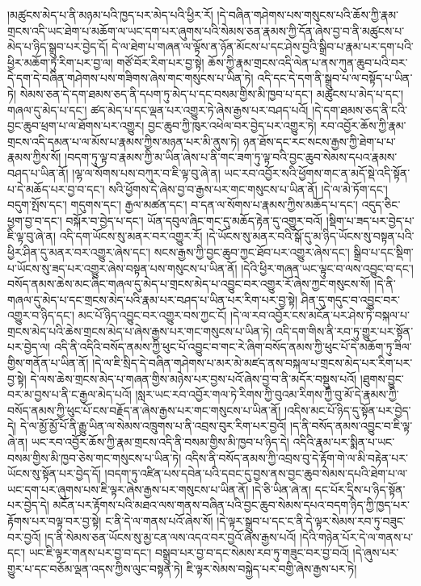 །མཚུངས་མེད་པ་ནི་མཉམ་པའི་ཁྱད་པར་མེད་པའི་ཕྱིར་རོ། །དེ་བཞིན་གཤེགས་པས་གསུངས་པའི་ཆོས་ཀྱི་རྣམ་གྲངས་འདི་ཡང་ཐེག་པ་མཆོག་ལ་ཡང་དག་པར་ཞུགས་པའི་སེམས་ཅན་རྣམས་ཀྱི་དོན་ཞེས་བྱ་བ་ནི་མཚུངས་པ་མེད་པ་ཉིད་སྒྲུབ་པར་བྱེད་དོ། དེ་ལ་ཐེག་པ་གཞན་ལ་ལྟོས་ན་ཉོན་མོངས་པ་དང་ཤེས་བྱའི་སྒྲིབ་པ་རྣམ་པར་དག་པའི་ཕྱིར་མཆོག་ཏུ་རིག་པར་བྱ་ལ། གཙོ་བོར་རིག་པར་བྱ་སྟེ། ཆོས་ཀྱི་རྣམ་གྲངས་འདི་ལེན་པ་ནས་ཀུན་ཆུབ་པའི་བར་དེ་དག་དེ་བཞིན་གཤེགས་པས་གཟིགས་ཞེས་གང་གསུངས་པ་ཡིན་ཏེ། འདི་དང་དེ་དག་ནི་སྒྲུབ་པ་ལ་བསྟོད་པ་ཡིན་ཏེ། སེམས་ཅན་དེ་དག་ཐམས་ཅད་ནི་དཔག་ཏུ་མེད་པ་དང་བསམ་གྱིས་མི་ཁྱབ་པ་དང་། མཚུངས་པ་མེད་པ་དང་། གཞལ་དུ་མེད་པ་དང་། ཚད་མེད་པ་དང་ལྡན་པར་འགྱུར་ཏེ་ཞེས་རྒྱས་པར་བཤད་པའོ། །དེ་དག་ཐམས་ཅད་ནི་ངའི་བྱང་ཆུབ་ཕྲག་པ་ལ་ཐོགས་པར་འགྱུར། བྱང་ཆུབ་ཀྱི་ཁུར་འཕེལ་བར་བྱེད་པར་འགྱུར་ཏེ། རབ་འབྱོར་ཆོས་ཀྱི་རྣམ་གྲངས་འདི་དམན་པ་ལ་མོས་པ་རྣམས་ཀྱིས་མཉན་པར་མི་ནུས་ཏེ། ཉན་ཐོས་དང་རང་སངས་རྒྱས་ཀྱི་ཐེག་པ་པ་རྣམས་ཀྱིས་སོ། །བདག་ཏུ་ལྟ་བ་རྣམས་ཀྱི་མ་ཡིན་ཞེས་པ་ནི་གང་ཟག་ཏུ་ལྟ་བའི་བྱང་ཆུབ་སེམས་དཔའ་རྣམས་བཤད་པ་ཡིན་ནོ། །ལྷ་ལ་སོགས་པས་བཀུར་བ་ཇི་ལྟ་བུ་ཞེ་ན། ཡང་རབ་འབྱོར་སའི་ཕྱོགས་གང་ན་མདོ་སྡེ་འདི་སྟོན་པ་དེ་མཆོད་པར་བྱ་བ་དང་། སའི་ཕྱོགས་དེ་ཞེས་བྱ་བ་རྒྱས་པར་གང་གསུངས་པ་ཡིན་ནོ། །དེ་ལ་མེ་ཏོག་དང་། བདུག་སྤོས་དང་། གདུགས་དང་། རྒྱལ་མཚན་དང་། བ་དན་ལ་སོགས་པ་རྣམས་ཀྱིས་མཆོད་པ་དང་། འདུད་ཅིང་ཕྱག་བྱ་བ་དང་། བསྐོར་བ་བྱེད་པ་དང་། ཡོན་དབུལ་ཞིང་གང་དུ་མཆོད་རྟེན་དུ་འགྱུར་བའོ། །སྡིག་པ་ཟད་པར་བྱེད་པ་ཇི་ལྟ་བུ་ཞེ་ན། འདི་དག་ཡོངས་སུ་མནར་བར་འགྱུར་རོ། །དེ་ཡོངས་སུ་མནར་བའི་སྒོ་དུ་མ་ཉིད་ཡོངས་སུ་བསྟན་པའི་ཕྱིར་ཤིན་དུ་མནར་བར་འགྱུར་ཞེས་དང་། སངས་རྒྱས་ཀྱི་བྱང་ཆུབ་ཀྱང་ཐོབ་པར་འགྱུར་ཞེས་དང་། སྒྲིབ་པ་དང་སྡིག་པ་ཡོངས་སུ་ཟད་པར་འགྱུར་ཞེས་བསྟན་པས་གསུངས་པ་ཡིན་ནོ། །དེའི་ཕྱིར་གཞན་ཡང་ལྟུང་བ་ལས་འབྱུང་བ་དང་། བསོད་ནམས་ཆེས་མང་ཞིང་གཞལ་དུ་མེད་པ་གྲངས་མེད་པ་འབྱུང་བར་འགྱུར་རོ་ཞེས་ཀྱང་གསུངས་སོ། །དེ་ནི་གཞལ་དུ་མེད་པ་དང་གྲངས་མེད་པའི་རྣམ་པར་བཤད་པ་ཡིན་པར་རིག་པར་བྱ་སྟེ། ཤིན་དུ་གདུང་བ་འབྱུང་བར་འགྱུར་བ་ཉིད་དང་། མང་པོ་ཉིད་འབྱུང་བར་འགྱུར་བས་ཀྱང་ངོ། །དེ་ལ་རབ་འབྱོར་ངས་མངོན་པར་ཤེས་ཏེ་བསྐལ་པ་གྲངས་མེད་པའི་ཆེས་གྲངས་མེད་པ་ཞེས་རྒྱས་པར་གང་གསུངས་པ་ཡིན་ཏེ། འདི་དག་གིས་ནི་རབ་ཏུ་གྱུར་པར་སྟོན་པར་བྱེད་ལ། འདི་ནི་འདིའི་བསོད་ནམས་ཀྱི་ཕུང་པོ་འབྱུང་བ་གང་རེ་ཞིག་བསོད་ནམས་ཀྱི་ཕུང་པོ་དེ་མཆོག་ཏུ་ཟིལ་གྱིས་གནོན་པ་ཡིན་ནོ། །དེ་ལ་ཇི་སྲིད་དེ་བཞིན་གཤེགས་པ་མར་མེ་མཛད་ནས་བསྐལ་པ་གྲངས་མེད་པར་རིག་པར་བྱ་སྟེ། དེ་ལས་ཆེས་གྲངས་མེད་པ་གཞན་གྱིས་མཉེས་པར་བྱས་པའོ་ཞེས་བྱ་བ་ནི་མདོར་བསྡུས་པའོ། །ཐུགས་བྱུང་བར་མ་བྱས་པ་ནི་ང་རྒྱལ་མེད་པའོ། །སླར་ཡང་རབ་འབྱོར་གལ་ཏེ་རིགས་ཀྱི་བུའམ་རིགས་ཀྱི་བུ་མོ་དེ་རྣམས་ཀྱི་བསོད་ནམས་ཀྱི་ཕུང་པོ་ངས་བརྗོད་ན་ཞེས་རྒྱས་པར་གང་གསུངས་པ་ཡིན་ནོ། །འདིས་མང་པོ་ཉིད་དུ་སྟོན་པར་བྱེད་དེ། དེ་ལ་མྱོ་མྱོ་པོ་ནི་རྒྱུ་ཡིན་ལ་སེམས་འཁྲུགས་པ་ནི་འབྲས་བུར་རིག་པར་བྱའོ། །ད་ནི་བསོད་ནམས་འབྱུང་བ་ཇི་ལྟ་ཞེ་ན། ཡང་རབ་འབྱོར་ཆོས་ཀྱི་རྣམ་གྲངས་འདི་ནི་བསམ་གྱིས་མི་ཁྱབ་པ་ཉིད་དེ། འདིའི་རྣམ་པར་སྨིན་པ་ཡང་བསམ་གྱིས་མི་ཁྱབ་ཅེས་གང་གསུངས་པ་ཡིན་ཏེ། འདིས་ནི་བསོད་ནམས་ཀྱི་འབྲས་བུ་དེ་རྟོག་གེ་ལ་མི་བརྟེན་པར་ཡོངས་སུ་སྟོན་པར་བྱེད་དོ། །བདག་ཏུ་འཛིན་པས་དབེན་པའི་དབང་དུ་བྱས་ནས་བྱང་ཆུབ་སེམས་དཔའི་ཐེག་པ་ལ་ཡང་དག་པར་ཞུགས་པས་ཇི་ལྟར་ཞེས་རྒྱས་པར་གསུངས་པ་ཡིན་ནོ། །དེ་ཅི་ཡིན་ཞེ་ན། དང་པོར་དྲིས་པ་ཉིད་སྟོན་པར་བྱེད་དེ། མངོན་པར་རྟོགས་པའི་མཐའ་ལས་གནས་བཞིན་པའི་བྱང་ཆུབ་སེམས་དཔའ་བདག་ཉིད་ཀྱི་ཁྱད་པར་རྟོགས་པར་བལྟ་བར་བྱ་སྟེ། ང་ནི་དེ་ལ་གནས་པའོ་ཞེས་སོ། །དེ་ལྟར་སྒྲུབ་པ་དང་ང་ནི་དེ་ལྟར་སེམས་རབ་ཏུ་བཟུང་བར་བྱའོ། །ད་ནི་སེམས་ཅན་ཡོངས་སུ་མྱ་ངན་ལས་འདའ་བར་བྱའོ་ཞེས་རྒྱས་པའོ། །དེའི་གཉེན་པོར་དེ་ལ་གནས་པ་དང་། ཡང་ཇི་ལྟར་གནས་པར་བྱ་བ་དང་། བསྒྲུབ་པར་བྱ་བ་དང་སེམས་རབ་ཏུ་གཟུང་བར་བྱ་བའོ། །དེ་ཞུས་པར་གྱུར་པ་དང་བཅོམ་ལྡན་འདས་ཀྱིས་ལུང་བསྟན་ཏེ། ཇི་ལྟར་སེམས་བསྐྱེད་པར་བགྱི་ཞེས་རྒྱས་པར་ཏེ། 